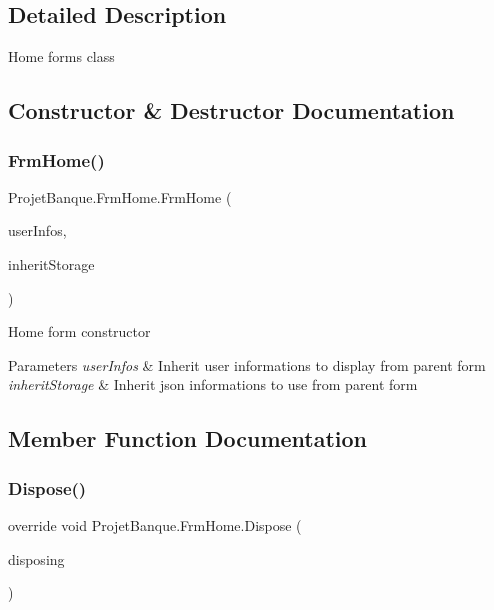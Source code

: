 \subsection{Detailed Description}
Home form\textquotesingle{}s class 



\subsection{Constructor \& Destructor Documentation}
\mbox{\label{class_projet_banque_1_1_frm_home_a737fa29ecf98ef35e4675e3288ab7555}} 
\subsubsection{\texorpdfstring{FrmHome()}{FrmHome()}}
{\footnotesize\ttfamily Projet\+Banque.\+Frm\+Home.\+Frm\+Home (\begin{DoxyParamCaption}\item[{\mbox{\hyperlink{class_projet_banque_1_1_public_user}{Public\+User}}}]{user\+Infos,  }\item[{\mbox{\hyperlink{class_projet_banque_1_1_json_data}{Json\+Data}}}]{inherit\+Storage }\end{DoxyParamCaption})}



Home form constructor 


\begin{DoxyParams}{Parameters}
{\em user\+Infos} & Inherit user informations to display from parent form\\
\hline
{\em inherit\+Storage} & Inherit json informations to use from parent form\\
\hline
\end{DoxyParams}


\subsection{Member Function Documentation}
\mbox{\label{class_projet_banque_1_1_frm_home_aa803b45ae773dfb9f1abe667c6b4de06}} 
\subsubsection{\texorpdfstring{Dispose()}{Dispose()}}
{\footnotesize\ttfamily override void Projet\+Banque.\+Frm\+Home.\+Dispose (\begin{DoxyParamCaption}\item[{bool}]{disposing }\end{DoxyParamCaption})\hspace{0.3cm}{\ttfamily [protected]}}



